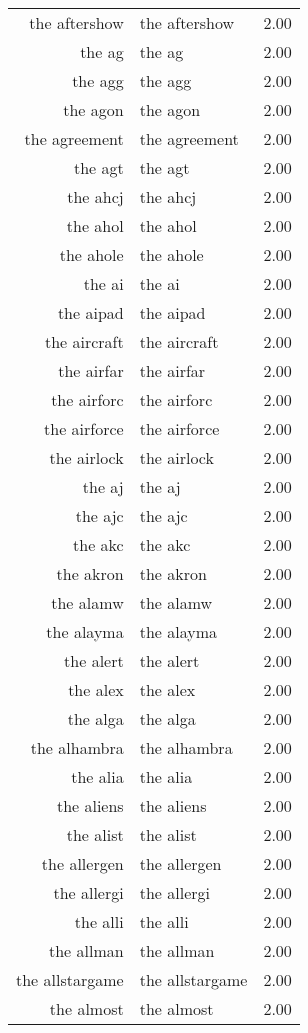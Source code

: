 \begin{table}[ht]
\begin{tabular}{rlr}
  the aftershow & the aftershow & 2.00 \\ 
  the ag & the ag & 2.00 \\ 
  the agg & the agg & 2.00 \\ 
  the agon & the agon & 2.00 \\ 
  the agreement & the agreement & 2.00 \\ 
  the agt & the agt & 2.00 \\ 
  the ahcj & the ahcj & 2.00 \\ 
  the ahol & the ahol & 2.00 \\ 
  the ahole & the ahole & 2.00 \\ 
  the ai & the ai & 2.00 \\ 
  the aipad & the aipad & 2.00 \\ 
  the aircraft & the aircraft & 2.00 \\ 
  the airfar & the airfar & 2.00 \\ 
  the airforc & the airforc & 2.00 \\ 
  the airforce & the airforce & 2.00 \\ 
  the airlock & the airlock & 2.00 \\ 
  the aj & the aj & 2.00 \\ 
  the ajc & the ajc & 2.00 \\ 
  the akc & the akc & 2.00 \\ 
  the akron & the akron & 2.00 \\ 
  the alamw & the alamw & 2.00 \\ 
  the alayma & the alayma & 2.00 \\ 
  the alert & the alert & 2.00 \\ 
  the alex & the alex & 2.00 \\ 
  the alga & the alga & 2.00 \\ 
  the alhambra & the alhambra & 2.00 \\ 
  the alia & the alia & 2.00 \\ 
  the aliens & the aliens & 2.00 \\ 
  the alist & the alist & 2.00 \\ 
  the allergen & the allergen & 2.00 \\ 
  the allergi & the allergi & 2.00 \\ 
  the alli & the alli & 2.00 \\ 
  the allman & the allman & 2.00 \\ 
  the allstargame & the allstargame & 2.00 \\ 
  the almost & the almost & 2.00 \\ 

\end{tabular}
\end{table}
